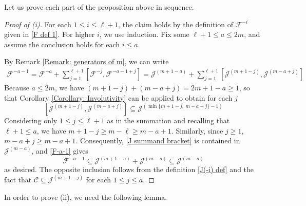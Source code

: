\documentclass[11pt,letterpaper]{amsart}
\numberwithin{equation}{section}
\begin{document}
Let us prove each part of the proposition above in sequence.
\begin{proof}[Proof of (i)]
    For each $1\leq i\leq \ell+1$, the claim holds by the definition of $\mathcal{F}^{-i}$ given in \eqref{F def 1}. For higher $i$, we use induction. Fix some $\ell+1\leq a \leq 2m$, and assume the conclusion holds for each $i\leq a$. 

    By Remark \ref{Remark: generators of m}, we can write
    \begin{gather}
        \label{F-a-1}
        \mathcal{F}^{-a-1} = \mathcal{F}^{-a} + \sum_{j=1}^{\ell+1}[\mathcal{F}^{-j},\mathcal{F}^{-a-1+j}] 
        =
        \mathcal{J}^{(m+1-a)} + \sum_{j=1}^{\ell+1}[\mathcal{J}^{(m+1-j)},\mathcal{J}^{(m-a+j)}]
    \end{gather}
    Because $a\leq 2m$, we have $(m+1-j) + (m-a+j) = 2m+1-a\geq 1$, so that Corollary \ref{Corollary: Involutivity} can be applied to obtain for each $j$
    \begin{equation}
        \label{J summand bracket}
        [\mathcal J^{(m+1-j)},\mathcal J^{(m-a+j)}]\subseteq \mathcal J^{(\min\{m+1-j,\ m-a+j\}-1)}
    \end{equation}
    Considering only $1\leq j \leq \ell+1$ as in the summation and recalling that $\ell+1\leq a$, we have $m+1-j\geq m-\ell\geq m-a+1.$ Similarly, since $j\geq 1$, $m-a+j\geq m-a+1$. Consequently, \eqref{J summand bracket} is contained in $\mathcal J^{(m-a)}$, and \eqref{F-a-1} gives
    \begin{equation}
        \mathcal F^{-a-1}\subseteq \mathcal J^{(m+1-a)}+ \mathcal J^{(m-a)}\subseteq \mathcal J^{(m-a)}
    \end{equation}
    as desired. The opposite inclusion follows from the definition \eqref{J(-i) def} and the fact that $\mathcal{C}\subseteq \mathcal{J}^{(m+1-j)}$ for each $1\leq j \leq a$.
\end{proof}

In order to prove (ii), we need the following lemma.
\end{document}
